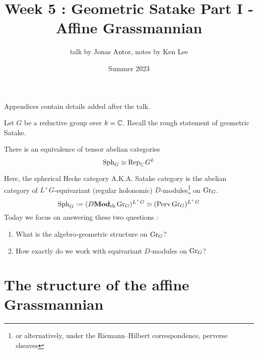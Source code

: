 \documentclass{article}
\begin{document}
\title{Week 5 : Geometric Satake Part I - Affine Grassmannian}

\author{talk by Jonas Antor, notes by Ken Lee}
\date{Summer 2023}
\maketitle

Appendices contain details added after the talk.

\tableofcontents  


Let $G$ be a reductive group over $k = \mathbb{C}$.
Recall the rough statement of geometric Satake.

\begin{prop}

  There is an equivalence of tensor abelian categories
  \[
    \operatorname{Sph}_G \simeq \operatorname{Rep}_{\mathbb{C}} G^L
  \]
\end{prop}

Here, the spherical Hecke category A.K.A. Satake category is 
the abelian category of $L^+G$-equivariant 
(regular holonomic) $D$-modules\footnote{
  or alternatively, under the Riemann--Hilbert correspondence,
  perverse sheaves
} on $\operatorname{Gr}_G$.
\[
  \operatorname{Sph}_G := (D\mathbf{Mod}_{\text{rh}} \operatorname{Gr}_G)^{L^+ G} \simeq
  (\operatorname{Perv} \operatorname{Gr}_G)^{L^+ G}
\]
Today we focus on answering these two questions : 
\begin{enumerate}
  \item What is the algebro-geometric structure on $\operatorname{Gr}_G$?
  \item How exactly do we work with equivariant $D$-modules on $\operatorname{Gr}_G$?
\end{enumerate}

\section{The structure of the affine Grassmannian}
\end{document}
